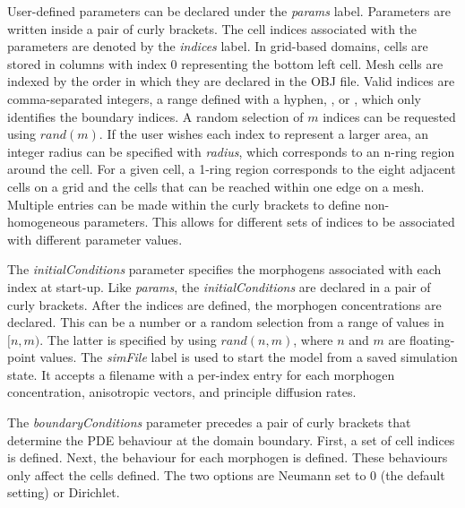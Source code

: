 User-defined parameters can be declared under the \textit{params} label. Parameters are written inside a pair of curly brackets. The cell indices associated with the parameters are denoted by the \textit{indices} label. In grid-based domains, cells are stored in columns with index 0 representing the bottom left cell. Mesh cells are indexed by the order in which they are declared in the OBJ file. Valid indices are comma-separated integers, a range defined with a hyphen, , or , which only identifies the boundary indices. A random selection of $m$ indices can be requested using $rand(m)$. If the user wishes each index to represent a larger area, an integer radius can be specified with \textit{radius}, which corresponds to an n-ring region around the cell. For a given cell, a 1-ring region corresponds to the eight adjacent cells on a grid and the cells that can be reached within one edge on a mesh. Multiple entries can be made within the curly brackets to define non-homogeneous parameters. This allows for different sets of indices to be associated with different parameter values.

The \textit{initialConditions} parameter specifies the morphogens associated with each index at start-up. Like \textit{params}, the \textit{initialConditions} are declared in a pair of curly brackets. After the indices are defined, the morphogen concentrations are declared. This can be a number or a random selection from a range of values in $[n, m)$. The latter is specified by using $rand(n, m)$, where $n$ and $m$ are floating-point values. The \textit{simFile} label is used to start the model from a saved simulation state. It accepts a filename with a per-index entry for each morphogen concentration, anisotropic vectors, and principle diffusion rates.

The \textit{boundaryConditions} parameter precedes a pair of curly brackets that determine the PDE behaviour at the domain boundary. First, a set of cell indices is defined. Next, the behaviour for each morphogen is defined. These behaviours only affect the cells defined. The two options are Neumann set to 0 (the default setting) or Dirichlet. 

